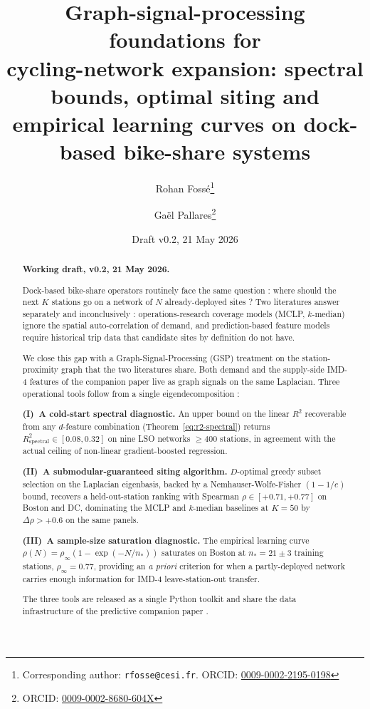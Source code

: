 \documentclass[11pt,a4paper]{article}
\title{\Large\bfseries Graph-signal-processing foundations for\\
\large cycling-network expansion: spectral bounds, optimal siting and\\
empirical learning curves on dock-based bike-share systems}
\author[1]{Rohan Fossé\thanks{Corresponding author: \texttt{rfosse@cesi.fr}. ORCID: \href{https://orcid.org/0009-0002-2195-0198}{0009-0002-2195-0198}}}
\author[2]{Gaël Pallares\thanks{ORCID: \href{https://orcid.org/0009-0002-8680-604X}{0009-0002-8680-604X}}}
\affil[1]{CESI Engineering School, Montpellier, France}
\affil[2]{CESI LINEACT (EA 7527), Montpellier, France}
\date{Draft v0.2, 21 May 2026}
\newcommand{\1}{\mathbb{1}}
\theoremstyle{plain}
\theoremstyle{definition}
\theoremstyle{remark}
\begin{document}
\maketitle

\begin{abstract}
\noindent
\textbf{Working draft, v0.2, 21 May 2026.}

Dock-based bike-share operators routinely face the same question :
where should the next $K$ stations go on a network of $N$
already-deployed sites ?  Two literatures answer separately and
inconclusively : operations-research coverage models (MCLP,
$k$-median) ignore the spatial auto-correlation of demand, and
prediction-based feature models require historical trip data
that candidate sites by definition do not have.

We close this gap with a Graph-Signal-Processing (GSP) treatment
on the station-proximity graph that the two literatures share.
Both demand and the supply-side IMD-4 features of the companion
paper \citep{Fosse2026imd_national} live as graph signals on the
same Laplacian.  Three operational tools follow from a single
eigendecomposition :

\textbf{(I)~A cold-start spectral diagnostic.}  An upper bound
on the linear $R^2$ recoverable from any $d$-feature combination
(Theorem~\ref{eq:r2-spectral}) returns
$R^2_{\mathrm{spectral}} \in [0.08, 0.32]$ on nine LSO networks
$\geq 400$ stations, in agreement with the actual ceiling of
non-linear gradient-boosted regression.

\textbf{(II)~A submodular-guaranteed siting algorithm.}
$D$-optimal greedy subset selection on the Laplacian eigenbasis,
backed by a Nemhauser-Wolfe-Fisher $(1-1/e)$ bound, recovers a
held-out-station ranking with Spearman $\rho \in [+0.71, +0.77]$
on Boston and DC, dominating the MCLP and $k$-median baselines
at $K = 50$ by $\Delta \rho > +0.6$ on the same panels.

\textbf{(III)~A sample-size saturation diagnostic.}  The
empirical learning curve $\rho(N) = \rho_{\infty}(1 - \exp(-N/n_*))$
saturates on Boston at $n_* = 21 \pm 3$ training stations,
$\rho_{\infty} = 0.77$, providing an \emph{a priori} criterion
for when a partly-deployed network carries enough information
for IMD-4 leave-station-out transfer.

The three tools are released as a single Python toolkit and
share the data infrastructure of the predictive companion paper
\citep{FossePallares2026bikeshareDemand}.


\end{abstract}
\end{document}
